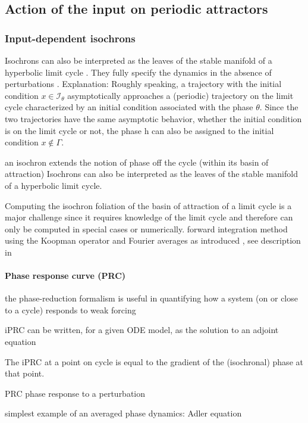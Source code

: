 \documentclass{article}
\theoremstyle{definition} \newtheorem{definition}{Definition}  \newtheorem{example}{Example}
\theoremstyle{remark} \newtheorem{remark}{Remark}
\newcounter{ct}
\begin{document}
\subsection{Action of the input on periodic attractors}\label{sec:perattaction}
\subsubsection{Input-dependent isochrons}\label{sec:iprc}
Isochrons can also be interpreted as the leaves of the stable manifold of a hyperbolic limit cycle \citep{ashwin2016mathematical}.
 They fully specify the dynamics in the absence of perturbations \citep{guckenheimer1975isochrons}. %
Explanation: Roughly speaking, a trajectory with the initial condition $x\in \mathcal{I}_\theta$ asymptotically approaches a (periodic) trajectory on the limit cycle characterized by an initial condition associated with the phase $\theta$.
 Since the two trajectories have the same asymptotic behavior, whether the initial condition is on the limit cycle or not, the phase h can also be assigned to the initial condition $x\not\in\Gamma$.
 
 an isochron extends the notion of phase off the cycle (within its basin of attraction)
 Isochrons can also be interpreted as the leaves of the stable manifold of a hyperbolic limit cycle.
 
 Computing the isochron foliation of the basin of attraction of a limit cycle is a major challenge since it requires knowledge of the limit cycle and therefore can only be computed in special cases or numerically.
forward integration method using the Koopman operator and Fourier averages as introduced \citep{mauroy2012use}, see description in \citep{ashwin2016mathematical}


\paragraph{Phase response curve (PRC)}
the phase-reduction formalism is useful in quantifying how a system (on or close to a cycle) responds to weak forcing

iPRC
can be written, for a given ODE model, as the solution to an adjoint equation

The iPRC at a point on cycle is equal to the gradient of the (isochronal) phase at that point.

PRC
phase response to a perturbation \citep{rinzel1998analysis}

simplest example of an averaged phase dynamics: Adler equation \citep{adler1946study}
\end{document}
